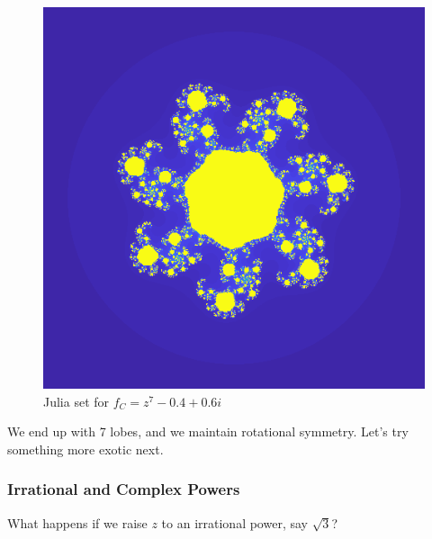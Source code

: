 \documentclass[12pt]{article}
\begin{document}
\begin{figure}[H]
	\centering
	\includegraphics[scale=0.5]{seven.png}
	\caption{Julia set for $f_C = z^7 - 0.4 + 0.6i$}
\end{figure}

We end up with 7 lobes, and we maintain rotational symmetry. Let's try something more exotic next.

\subsubsection{Irrational and Complex Powers}

What happens if we raise $z$ to an irrational power, say $\sqrt{3}$?
\end{document}
